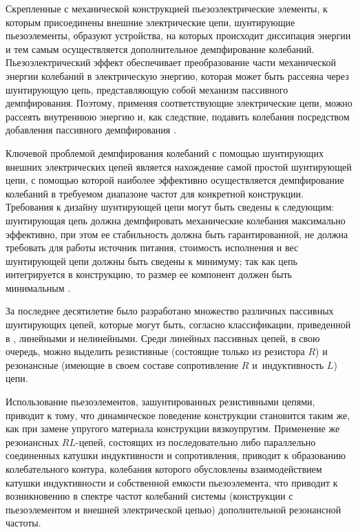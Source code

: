 




\makerutitle






Скрепленные с механической конструкцией пьезоэлектрические элементы, к которым присоединены внешние электрические цепи, шунтирующие пьезоэлементы,   образуют устройства, на которых происходит диссипация энергии и тем самым осуществляется дополнительное демпфирование колебаний. Пьезоэлектрический эффект обеспечивает преобразование части механической энергии колебаний в электрическую энергию, которая может быть рассеяна через шунтирующую цепь, представляющую собой механизм пассивного демпфирования. Поэтому, применяя соответствующие электрические цепи, можно рассеять внутреннюю энергию и, как следствие, подавить колебания посредством добавления пассивного демпфирования \cite{mult:Ref1}.



Ключевой проблемой демпфирования колебаний с помощью шунтирующих внешних электрических цепей является нахождение самой простой шунтирующей цепи, с помощью которой наиболее эффективно осуществляется демпфирование колебаний в требуемом диапазоне частот для конкретной конструкции. Требования к дизайну шунтирующей цепи могут быть сведены к следующим: шунтирующая цепь должна демпфировать механические колебания максимально эффективно, при этом ее стабильность должна быть гарантированной, не должна требовать для работы источник питания, стоимость исполнения и вес шунтирующей цепи должны быть сведены к минимуму; так как цепь интегрируется в конструкцию, то размер ее компонент должен быть минимальным \cite{mult:Ref2}.



За последнее десятилетие было разработано множество различных пассивных шунтирующих цепей, которые могут быть, согласно классификации, приведенной в \cite{mult:Ref2}, линейными и нелинейными. Среди линейных пассивных цепей, в свою очередь, можно выделить резистивные (состоящие только из резистора $R$) и резонансные (имеющие в своем составе сопротивление $R$ и~индуктивность $L$) цепи.



Использование пьезоэлементов, зашунтированных резистивными цепями, приводит к тому, что динамическое поведение конструкции становится таким же, как при замене упругого материала конструкции вязкоупругим. Применение же резонансных $RL$-цепей, состоящих из последовательно либо параллельно соединенных катушки индуктивности и сопротивления, приводит к образованию колебательного контура, колебания которого обусловлены взаимодействием катушки индуктивности и собственной емкости пьезоэлемента, что приводит к возникновению в спектре частот колебаний системы (конструкции с пьезоэлементом и внешней электрической цепью) дополнительной резонансной частоты.




